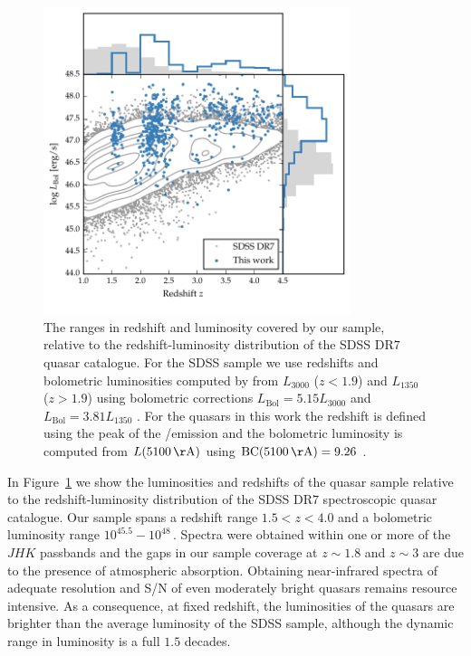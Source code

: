 \begin{figure}[h!]
    \centering
    \includegraphics[width=0.8\textwidth]{figures/chapter02/luminosity_z.pdf} 
    \caption[{The redshift and luminosity distribution of quasar sample.}]{The ranges in redshift and luminosity covered by our sample, relative to the redshift-luminosity distribution of the SDSS DR$7$ quasar catalogue. For the SDSS sample we use \citet{hewett10} redshifts and bolometric luminosities computed by \citet{shen11} from $L_{3000}$ ($z < 1.9$) and $L_{1350}$ ($z > 1.9$) using bolometric corrections $L_{\text{Bol}} = 5.15 L_{3000}$ and $L_{\text{Bol}} = 3.81 L_{1350}$ \citep{richards06}. For the quasars in this work the redshift is defined using the peak of the \hans/\hb emission and the bolometric luminosity is computed from $L(5100\,{\mathrm \AA})$ using $\text{BC}(5100\,{\mathrm \AA})=9.26$ \citep{richards06}.}     
    \label{fig:lzplane}
\end{figure}

In Figure~\ref{fig:lzplane} we show the luminosities and redshifts of the quasar sample relative to the redshift-luminosity distribution of the SDSS DR$7$ spectroscopic quasar catalogue.
Our sample spans a redshift range $1.5 < z < 4.0$ and a bolometric luminosity range $10^{45.5}-10^{48}$\,\ergs. 
Spectra were obtained within one or more of the $JHK$ passbands and the gaps in our sample coverage at $z\sim1.8$ and $z\sim3$ are due to the presence of atmospheric absorption. 
Obtaining near-infrared spectra of adequate resolution and S/N of even moderately bright quasars remains resource intensive. 
As a consequence, at fixed redshift, the luminosities of the quasars are brighter than the average luminosity of the SDSS sample, although the dynamic range in luminosity is a full $1.5$ decades.

